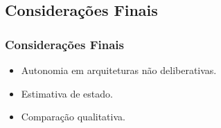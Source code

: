 \subsection{Considerações Finais}
\begin{frame}
	\frametitle{Considerações Finais}
	
	\begin{block}{}
		\begin{itemize}
		  \item Autonomia em arquiteturas não deliberativas.
		  \item Estimativa de estado.
		  \item Comparação qualitativa.
		\end{itemize}
	\end{block}
\end{frame}